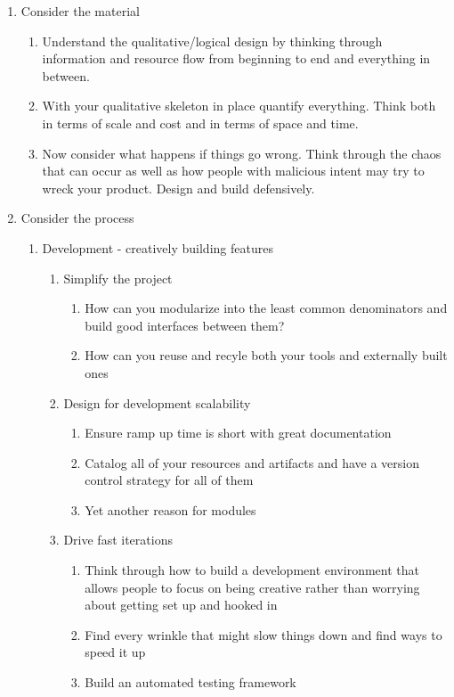 \documentclass[10pt,a5paper]{book}
\begin{document}
\begin{enumerate}
\item Consider the material
\begin{enumerate}
\item Understand the qualitative/logical design by thinking through information and resource flow from beginning to end and everything in between.
\item With your qualitative skeleton in place quantify everything. Think both in terms of scale and cost and in terms of space and time.
\item Now consider what happens if things go wrong. Think through the chaos that can occur as well as how people with malicious intent may try to wreck your product. Design and build defensively. 
\end{enumerate}

\item Consider the process
\begin{enumerate}
\item Development - creatively building features
\begin{enumerate}
\item Simplify the project
\begin{enumerate}
\item How can you modularize into the least common denominators and build good interfaces between them?
\item How can you reuse and recyle both your tools and externally built ones
\end{enumerate}

\item Design for development scalability
\begin{enumerate}
\item Ensure ramp up time is short with great documentation
\item Catalog all of your resources and artifacts and have a version control strategy for all of them
\item Yet another reason for modules
\end{enumerate}

\item Drive fast iterations
\begin{enumerate}
\item Think through how to build a development environment that allows people to focus on being creative rather than worrying about getting set up and hooked in
\item Find every wrinkle that might slow things down and find ways to speed it up
\item Build an automated testing framework
\end{enumerate}


\end{enumerate}
\end{enumerate}
\end{enumerate}
\end{document}
